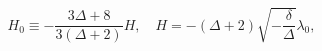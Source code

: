 \begin{equation}
H_0 \equiv -\frac{3\Delta+8}{3 (\Delta +2)} H, \quad 
H=- (\Delta + 2) \sqrt{- \frac{\delta}{\Delta}} \lambda_{0},
\end{equation}


